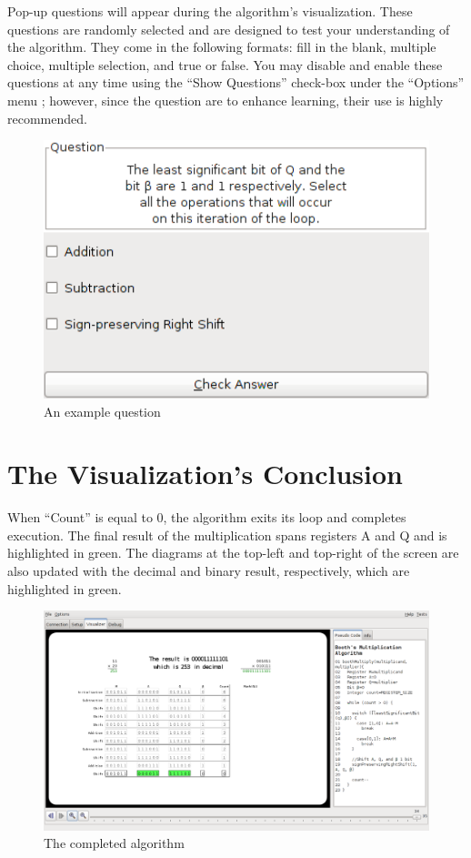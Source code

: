 \documentclass{article}
\begin{document}
Pop-up questions will appear during the algorithm's visualization.
These questions are randomly selected and are designed to test your understanding of the algorithm.
They come in the following formats: fill in the blank, multiple choice, multiple selection, and true or false.
You may disable and enable these questions at any time using the ``Show Questions'' check-box under the ``Options'' menu ; however, since the question are to enhance learning, their use is highly recommended.

\begin{figure}[h]
\centering
\includegraphics[scale=0.5]{que.pdf}
\caption{An example question}
\end{figure}

\pagebreak

\section{The Visualization's Conclusion}
When ``Count'' is equal to 0, the algorithm exits its loop and completes execution.
The final result of the multiplication spans registers A and Q and is highlighted in green.
The diagrams at the top-left and top-right of the screen are also updated with the decimal and binary result, respectively, which are highlighted in green.

\begin{figure}[h]
\centering
\includegraphics[scale=0.3]{finish.pdf}
\caption{The completed algorithm}
\end{figure}
\end{document}
